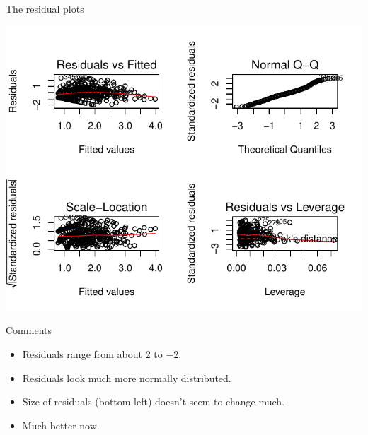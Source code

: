 \begin{frame}[fragile]{The residual plots}

 
\begin{knitrout}
\color{fgcolor}\begin{kframe}
\begin{alltt}
\hlstd{(}\hlstd{=}\hlstd{(}\hlstd{,}\hlstd{)) ;} 
\end{alltt}
\end{kframe}
\includegraphics[width=\maxwidth]{figure/asljsakjhd-1} 

\end{knitrout}
  
  
\end{frame}

\begin{frame}[fragile]{Comments}

  
  \begin{itemize}
  \item Residuals range from about 2 to $-2$.
  \item Residuals look much more normally distributed.
  \item Size of residuals (bottom left) doesn't seem to change much.
  \item Much better now.
  \end{itemize}
  
  
\end{frame}

